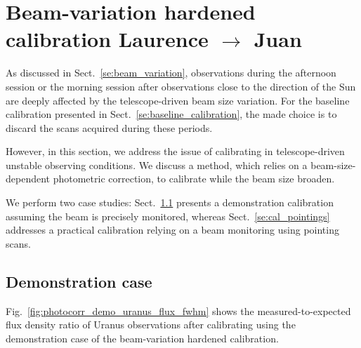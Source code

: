 \section{Beam-variation hardened calibration {\color{blue} Laurence $\rightarrow$ Juan} }

As discussed in Sect.~\ref{se:beam_variation}, observations during the
afternoon session or the morning session after observations close to the
direction of the Sun are deeply affected by the telescope-driven beam
size variation. For the baseline calibration presented in
Sect.~\ref{se:baseline_calibration}, the made choice is to discard the
scans acquired during these periods.

However, in this section, we address the issue of calibrating in
telescope-driven unstable observing conditions. We discuss a method,
which relies on a beam-size-dependent photometric correction, to
calibrate while the beam size broaden.

We perform two case studies: Sect.~\ref{se:cal_democase} presents a demonstration
calibration assuming the beam is precisely monitored, whereas
Sect.~\ref{se:cal_pointings} addresses a practical calibration relying
on a beam monitoring using pointing scans. 


\subsection{Demonstration case}
\label{se:cal_democase}


Fig.~\ref{fig:photocorr_demo_uranus_flux_fwhm} shows the
measured-to-expected flux density ratio of Uranus observations after
calibrating using the demonstration case of the beam-variation
hardened calibration. 

